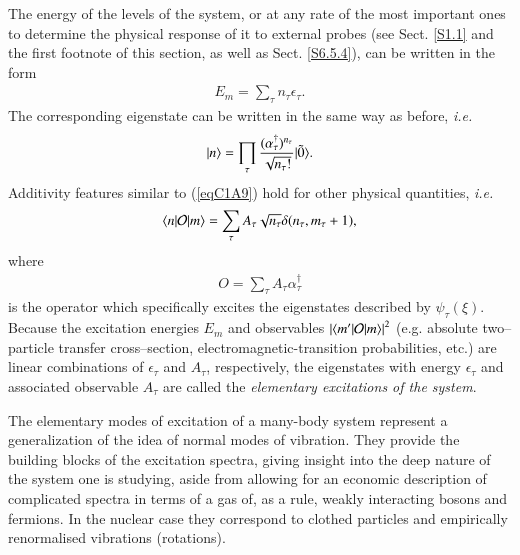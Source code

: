 The energy of the levels of the system, or at any rate of the most important
ones to determine the physical response of it to external probes (see Sect. \ref{S1.1} and the first footnote of this section, as well as Sect. \ref{S6.5.4}), can be written
in the form
\begin{align}\label{eqC1A9}
E_m=\sum_{\tau}n_\tau \epsilon_\tau.
\end{align}
The corresponding eigenstate can be written in the same way as before, \textit{i.e.}
\begin{align}\label{eqC1A10}
|{n} \rangle=\prod_\tau\frac{(\alpha_\tau^\dagger)^{n_\tau}}{\sqrt{n_\tau!}}|{\tilde 0} \rangle.
\end{align}
Additivity features similar to (\ref{eqC1A9}) hold for other physical quantities, \textit{i.e.}
\begin{align}\label{eqC1A11}
\langle {n|\mathcal O|m} \rangle=\sum_{\tau}A_\tau\sqrt{n_\tau} \delta(n_\tau,m_\tau+1),
\end{align}
where
\begin{align}\label{eqC1A12} O=\sum_{\tau}A_\tau \alpha_\tau^\dagger
\end{align}
is the operator which specifically excites the eigenstates described by $\psi_\tau(\xi)$.
Because the excitation energies $E_m$ and observables $\left|\langle {m'|\mathcal O|m} \rangle\right|^2$ (e.g. absolute two--particle transfer cross--section, electromagnetic-transition probabilities, etc.) are
linear combinations of $\epsilon_\tau$ and $A_\tau$, respectively, the eigenstates with energy $\epsilon_\tau$
and associated observable $A_\tau$ are called the \textit{elementary excitations of the system}.


The elementary modes of excitation  of a many-body system  represent a generalization of  the idea of normal modes of vibration.
They provide the building blocks of the excitation spectra, giving  insight  into the  deep nature  of the system one is studying, aside from allowing 
for an economic description  of complicated spectra in terms of a gas of, as a rule, weakly interacting bosons and fermions. In the nuclear case 
they correspond to clothed particles and empirically renormalised vibrations (rotations).

